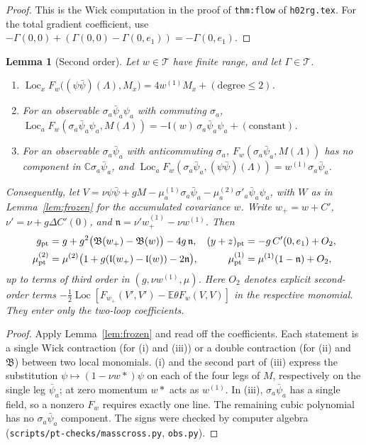 \documentclass[11pt]{amsart}
\newtheorem{lemma}[theorem]{Lemma}
\theoremstyle{definition}
\theoremstyle{remark}
\numberwithin{equation}{section}
\newcommand{\C}{\mathbb{C}}
\newcommand{\E}{\mathbb{E}}
\newcommand{\cT}{\mathcal{T}}
\newcommand{\Loc}{\operatorname{Loc}}
\newcommand{\hr}{\texttt{h02rg.tex}}
\begin{document}
\begin{proof}
This is the Wick computation in the proof of \texttt{thm:flow} of \hr{}. For the
total gradient coefficient, use $-\Gamma(0,0)+(\Gamma(0,0)-\Gamma(0,e_1))=-\Gamma(0,e_1)$.
\end{proof}

\begin{lemma}[Second order]\label{lem:second}
Let $w\in\cT$ have finite range, and let $\Gamma\in\cT$.
\begin{enumerate}[label=(\roman*)]
\item $\Loc_xF_w\bigl((\psi\bar\psi)(\Lambda),M_x\bigr)=4w^{(1)}M_x+(\text{degree}\le2)$.
\item For an observable $\sigma_a\bar\psi_a\psi_a$ with commuting $\sigma_a$,
  $\Loc_aF_w(\sigma_a\bar\psi_a\psi_a,M(\Lambda))=-\mathfrak l(w)\,\sigma_a\bar\psi_a\psi_a+(\text{constant})$.
\item For an observable $\sigma_a\bar\psi_a$ with anticommuting $\sigma_a$,
  $F_w(\sigma_a\bar\psi_a,M(\Lambda))$ has no component in $\C\sigma_a\bar\psi_a$, and
  $\Loc_aF_w(\sigma_a\bar\psi_a,(\psi\bar\psi)(\Lambda))=w^{(1)}\sigma_a\bar\psi_a$.
\end{enumerate}
Consequently, let $V=\nu\psi\bar\psi+gM-\mu^{(1)}_a\sigma_a\bar\psi_a-\mu^{(2)}_a\sigma'_a\bar\psi_a\psi_a$,
with $W$ as in Lemma~\ref{lem:frozen} for the accumulated covariance $w$. Write
$w_+=w+C'$, $\nu'=\nu+g\Delta C'(0)$, and $\mathfrak n=\nu'w_+^{(1)}-\nu w^{(1)}$. Then
\begin{align*}
  g_{\rm pt}&=g+g^2\bigl(\mathfrak B(w_+)-\mathfrak B(w)\bigr)-4g\,\mathfrak n,
  &(y+z)_{\rm pt}&=-g\,C'(0,e_1)+O_2,\\
  \mu^{(2)}_{\rm pt}&=\mu^{(2)}\bigl(1+g(\mathfrak l(w_+)-\mathfrak l(w))-2\mathfrak n\bigr),
  &\mu^{(1)}_{\rm pt}&=\mu^{(1)}(1-\mathfrak n)+O_2,
\end{align*}
up to terms of third order in $(g,\nu w^{(1)},\mu)$. Here $O_2$ denotes explicit second-order
terms $-\frac12\Loc[F_{w_+}(V',V')-\E\theta F_w(V,V)]$ in the respective monomial. They enter
only the two-loop coefficients.
\end{lemma}

\begin{proof}
Apply Lemma~\ref{lem:frozen} and read off the coefficients. Each statement is a single Wick
contraction (for (i) and (iii)) or a double contraction (for (ii) and $\mathfrak B$) between
two local monomials. (i) and the second part of (iii) express the substitution
$\psi\mapsto(1-\nu w*)\psi$ on each of the four legs of $M$, respectively on the single leg
$\bar\psi_a$; at zero momentum $w*$ acts as $w^{(1)}$. In (iii), $\sigma_a\bar\psi_a$ has a
single field, so a nonzero $F_w$ requires exactly one line. The remaining cubic polynomial has
no $\sigma_a\bar\psi_a$ component. The signs were checked by computer algebra
(\texttt{scripts/pt-checks/masscross.py}, \texttt{obs.py}).
\end{proof}
\end{document}
